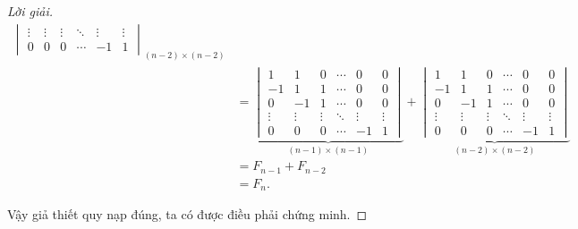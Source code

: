 \documentclass[class=nhvh-linear-algebra,crop=false]{standalone}
\begin{document}
\begin{proof}[Lời giải]
\begin{align*}
{\begin{vmatrix}
                            \vdots & \vdots & \vdots & \ddots & \vdots & \vdots \\
                            0      & 0      & 0      & \cdots & -1     & 1
                        \end{vmatrix}}_{(n-2)\times (n-2)} \\
         & =
        \underbrace{\begin{vmatrix}
                            1      & 1      & 0      & \cdots & 0      & 0      \\
                            -1     & 1      & 1      & \cdots & 0      & 0      \\
                            0      & -1     & 1      & \cdots & 0      & 0      \\
                            \vdots & \vdots & \vdots & \ddots & \vdots & \vdots \\
                            0      & 0      & 0      & \cdots & -1     & 1
                        \end{vmatrix}}_{(n-1)\times (n-1)}
        +
        \underbrace{\begin{vmatrix}
                            1      & 1      & 0      & \cdots & 0      & 0      \\
                            -1     & 1      & 1      & \cdots & 0      & 0      \\
                            0      & -1     & 1      & \cdots & 0      & 0      \\
                            \vdots & \vdots & \vdots & \ddots & \vdots & \vdots \\
                            0      & 0      & 0      & \cdots & -1     & 1
                        \end{vmatrix}}_{(n-2)\times (n-2)} \\
         & = F_{n-1} + F_{n-2}                                          \\
         & = F_{n}.
    \end{align*}
    \endgroup{}
    \par Vậy giả thiết quy nạp đúng, ta có được điều phải chứng minh.
\end{proof}
\end{document}
